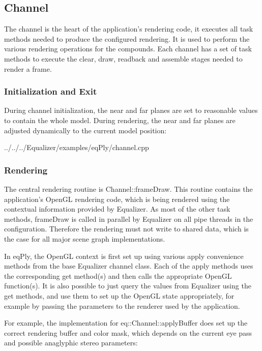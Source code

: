 \documentclass[10pt,a4]{scrartcl}
\begin{document}
\subsection{Channel}

The channel is the heart of the application's rendering code, it executes all
task methods needed to produce the configured rendering. It is used to perform
the various rendering operations for the compounds. Each channel has a set of
task methods to execute the clear, draw, readback and assemble stages needed to
render a frame.

\subsubsection{Initialization and Exit}

During channel initialization, the near and far planes are set to
reasonable values to contain the whole model. During rendering, the near
and far planes are adjusted dynamically to the current model position:

{\footnotesize
  {../../../Equalizer/examples/eqPly/channel.cpp}}

\subsubsection{Rendering}

The central rendering routine is \textsf{Channel::frameDraw}. This
routine contains the application's OpenGL rendering code, which is being
rendered using the contextual information provided by Equalizer. As most
of the other task methods, \textsf{frameDraw} is called in parallel by
Equalizer on all pipe threads in the configuration. Therefore the
rendering must not write to shared data, which is the case for all major
scene graph implementations.

In \textsf{eqPly}, the OpenGL context is first set up using various
\textsf{apply} convenience methods from the base Equalizer channel
class. Each of the \textsf{apply} methods uses the corresponding
\textsf{get} method(s) and then calls the appropriate OpenGL
function(s). It is also possible to just query the values from Equalizer
using the \textsf{get} methods, and use them to set up the OpenGL state
appropriately, for example by passing the parameters to the renderer used
by the application.

For example, the implementation for \textsf{eq::Channel::applyBuffer}
does set up the correct rendering buffer and color mask, which depends
on the current eye pass and possible anaglyphic stereo parameters:
\end{document}
